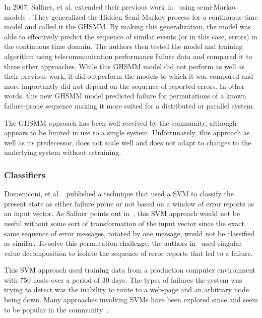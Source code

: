 In 2007, Salfner, et al. extended their previous work in~\cite{salfner2006}
using semi-Markov models~\cite{salfner2007}.  They generalized the Hidden
Semi-Markov process for a continuous-time model and called it the \ac{GHSMM}.
By making this generalization, the model was able to effectively predict the
sequence of similar events (or in this case, errors) in the continuous time
domain.  The authors then tested the model and training algorithm using
telecommunication performance failure data and compared it to three other
approaches.  While this \ac{GHSMM} model did not perform as well as their
previous work, it did outperform the models to which it was compared and more
importantly did not depend on the sequence of reported errors.  In other words,
this new \ac{GHSMM} model predicted failure for permutations of a known
failure-prone sequence making it more suited for a distributed or parallel
system.

The \ac{GHSMM} approach has been well received by the community, although
appears to be limited in use to a single system.  Unfortunately, this approach
as well as its predecessor, does not scale well and does not adapt to changes
to the underlying system without retraining.

\subsubsection{Classifiers}
Domeniconi, et al.~\cite{domeniconi2002} published a technique that used a
\ac{SVM} to classify the present state as either failure prone or not based on
a window of error reports as an input vector.  As Salfner points out
in~\cite{salfnerSurvey}, this \ac{SVM} approach would not be useful without
some sort of transformation of the input vector since the exact same sequence
of error messages, rotated by one message, would not be classified as similar.
To solve this permutation challenge, the authors in~\cite{domeniconi2002} used
singular value decomposition to isolate the sequence of error reports that led
to a failure.

This \ac{SVM} approach used training data from a production computer
environment with 750 hosts over a period of 30 days.  The types of failures the
system was trying to detect was the inability to route to a web-page and an
arbitrary node being down.  Many approaches involving \ac{SVM}s have been
explored since and seem to be popular in the community~\cite{fronza2013,
fulp2008, murray2005, domeniconi2002, irrera2015}.

